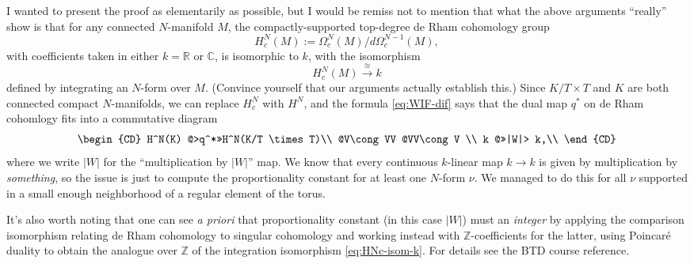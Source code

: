 \documentclass[reqno]{amsart} 
\begin{document}
\begin{remark}
  I wanted to present the proof as elementarily as possible, but I would be remiss not to mention that what the above arguments ``really'' show is that for any connected $N$-manifold $M$, the compactly-supported top-degree de Rham cohomology group
  \begin{equation}\label{eq:}
    H^N_c(M) := \Omega_c^N(M) / d \Omega_c^{N-1}(M),
  \end{equation}
  with coefficients taken in either $k = \mathbb{R}$ or $\mathbb{C}$, is isomorphic to $k$, with the isomorphism
  \begin{equation}\label{eq:HNc-isom-k}
    H^N_c(M) \xrightarrow{\cong} k
  \end{equation}
  defined by integrating an $N$-form over $M$.  (Convince yourself that our arguments actually establish this.)  Since $K/T \times T$ and $K$ are both connected compact $N$-manifolds, we can replace $H^N_c$ with $H^N$, and the formula \eqref{eq:WIF-dif} says that the dual map $q^*$ on de Rham cohomlogy fits into a commutative diagram
  \begin{equation*}
    \begin{CD}         
      H^N(K)   @>q^*>>H^N(K/T \times T)\\
      @V\cong VV  @VV\cong V \\
      k @>>|W|> k,\\
    \end{CD}
  \end{equation*}
  where we write $|W|$ for the ``multiplication by $|W|$'' map.  We know that every continuous $k$-linear map $k \rightarrow k$ is given by multiplication by \emph{something}, so the issue is just to compute the proportionality constant for at least one $N$-form $\nu$.  We managed to do this for all $\nu$ supported in a small enough neighborhood of a regular element of the torus.

  It's also worth noting that one can see \emph{a priori} that proportionality constant (in this case $|W|$) must an \emph{integer} by applying the comparison isomorphism relating de Rham cohomology to singular cohomology and working instead with $\mathbb{Z}$-coefficients for the latter, using Poincar{\'e} duality to obtain the analogue over $\mathbb{Z}$ of the integration isomorphism \eqref{eq:HNc-isom-k}.  For details see the BTD course reference.
\end{remark}
\end{document}
